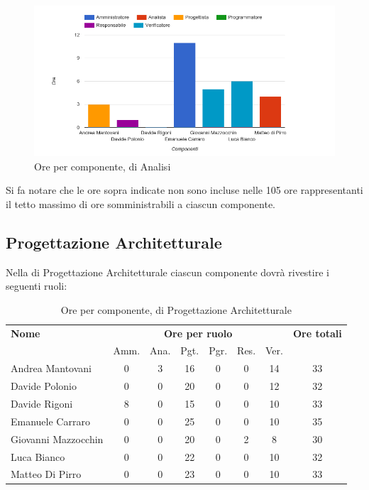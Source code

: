     \begin{figure}[H]
      \begin{center}
        \includegraphics[width=15cm]{res/img/suddivisioneRuoloProspettoOrario/orePerComponenteAnalisiMiglioramenti.png}
      \caption{Ore per componente,  di Analisi}
      \end{center} 
    \end{figure}    
    
Si fa notare che le ore sopra indicate non sono incluse nelle 105 ore rappresentanti il tetto massimo di ore somministrabili a ciascun componente.


\pagebreak
\subsection{Progettazione Architetturale}
Nella  di Progettazione Architetturale ciascun componente dovrà rivestire i seguenti ruoli:

\begin{table}[H]
\begin{tabular}{lccccccc}
\toprule
    \textbf{Nome}  & \multicolumn{6}{c}{\textbf{Ore per ruolo}} & \textbf{Ore totali} \\
     & Amm. & Ana. & Pgt. & Pgr. & Res. & Ver. & \\
    \midrule
    
	   Andrea Mantovani & 0 & 3 & 16 & 0 & 0 & 14 & 33 \\
	     Davide Polonio & 0 & 0 & 20 & 0 & 0 & 12 & 32 \\
	      Davide Rigoni & 8 & 0 & 15 & 0 & 0 & 10 & 33 \\
	   Emanuele Carraro & 0 & 0 & 25 & 0 & 0 & 10 & 35 \\
	Giovanni Mazzocchin & 0 & 0 & 20 & 0 & 2 & 8 & 30 \\
	        Luca Bianco & 0 & 0 & 22 & 0 & 0 & 10 & 32 \\
	    Matteo Di Pirro & 0 & 0 & 23 & 0 & 0 & 10 & 33 \\
    
    \bottomrule
\end{tabular}
\caption{Ore per componente,  di Progettazione Architetturale}
\end{table}

